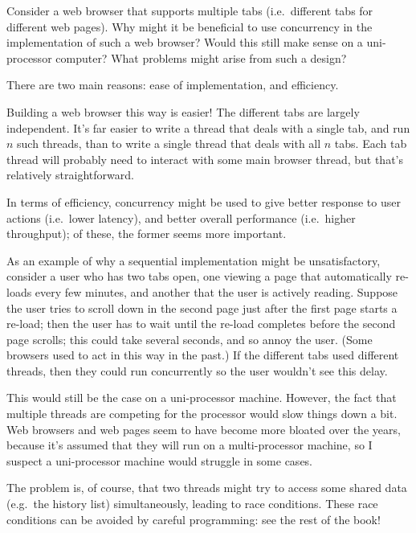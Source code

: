 \begin{questionS}
Consider a web browser that supports multiple tabs (i.e.~different
tabs for different web pages).  Why might it be beneficial to use
concurrency in the implementation of such a web browser?  Would this
still make sense on a uni-processor computer?  What problems might
arise from such a design?
\end{questionS}


\begin{answerS}
There are two main reasons: ease of implementation, and efficiency.

Building a web browser this way is easier!  The different tabs are largely
independent.  It's far easier to write a thread that deals with a single tab,
and run $n$ such threads, than to write a single thread that deals with all
$n$ tabs.  Each tab thread will probably need to interact with some main
browser thread, but that's relatively straightforward.

In terms of efficiency, concurrency might be used to give better response to
user actions (i.e.\ lower latency), and better overall performance (i.e.\
higher throughput); of these, the former seems more important.

As an example of why a sequential implementation might be unsatisfactory,
consider a user who has two tabs open, one viewing a page that automatically
re-loads every few minutes, and another that the user is actively reading.
Suppose the user tries to scroll down in the second page just after the first
page starts a re-load; then the user has to wait until the re-load completes
before the second page scrolls; this could take several seconds, and so annoy
the user.  (Some browsers used to act in this way in the past.)  If the different
tabs used different threads, then they could run concurrently so the user
wouldn't see this delay.  

This would still be the case on a uni-processor machine.  However, the fact
that multiple threads are competing for the processor would slow things down a
bit.  Web browsers and web pages seem to have become more bloated over the
years, because it's assumed that they will run on a multi-processor machine,
so I suspect a uni-processor machine would struggle in some cases.

The problem is, of course, that two threads might try to access some shared
data (e.g.~the history list) simultaneously, leading to race conditions.
These race conditions can be avoided by careful programming: see the rest of
the book!
\end{answerS}
